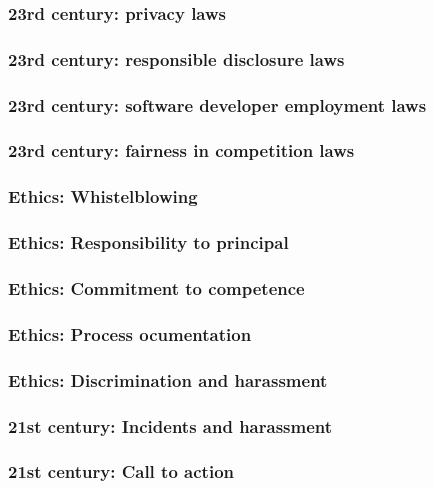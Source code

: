 \begin{frame}[fragile]
\frametitle{23rd century: privacy laws}

\end{frame}

\begin{frame}[fragile]
\frametitle{23rd century: responsible disclosure laws}

\end{frame}

\begin{frame}[fragile]
\frametitle{23rd century: software developer employment laws}

\end{frame}

\begin{frame}[fragile]
\frametitle{23rd century: fairness in competition laws}

\end{frame}

\begin{frame}[fragile]
\frametitle{Ethics: Whistelblowing}

\end{frame}

\begin{frame}[fragile]
\frametitle{Ethics: Responsibility to principal}

\end{frame}

\begin{frame}[fragile]
\frametitle{Ethics: Commitment to competence}

\end{frame}

\begin{frame}[fragile]
\frametitle{Ethics: Process ocumentation}

\end{frame}

\begin{frame}[fragile]
\frametitle{Ethics: Discrimination and harassment}

\end{frame}

\begin{frame}[fragile]
\frametitle{21st century: Incidents and harassment}

\end{frame}

\begin{frame}[fragile]
\frametitle{21st century: Call to action}

\end{frame}



